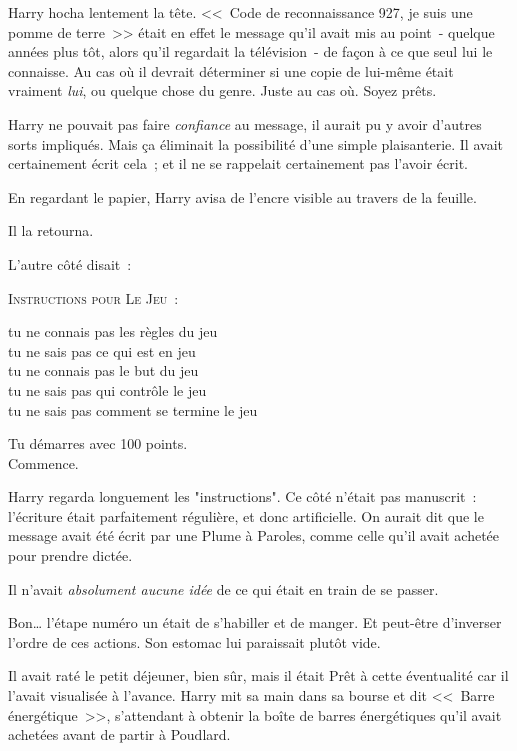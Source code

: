 Harry hocha lentement la tête. <<~Code de reconnaissance 927, je suis une pomme de terre~>> était en effet le message qu'il avait mis au point~- quelque années plus tôt, alors qu'il regardait la télévision~- de façon à ce que seul lui le connaisse. Au cas où il devrait déterminer si une copie de lui-même était vraiment \emph{lui}, ou quelque chose du genre. Juste au cas où. Soyez prêts.

Harry ne pouvait pas faire \emph{confiance} au message, il aurait pu y avoir d'autres sorts impliqués. Mais ça éliminait la possibilité d'une simple plaisanterie. Il avait certainement écrit cela~; et il ne se rappelait certainement pas l'avoir écrit.

En regardant le papier, Harry avisa de l'encre visible au travers de la feuille.

Il la retourna.

L'autre côté disait~:

\begin{writtenNote}\centering
\textsc{Instructions pour Le Jeu~:}

tu ne connais pas les règles du jeu\\
tu ne sais pas ce qui est en jeu\\
tu ne connais pas le but du jeu\\
tu ne sais pas qui contrôle le jeu\\
tu ne sais pas comment se termine le jeu


Tu démarres avec 100 points.\\
Commence.
\end{writtenNote}

Harry regarda longuement les "instructions". Ce côté n'était pas manuscrit~: l'écriture était parfaitement régulière, et donc artificielle. On aurait dit que le message avait été écrit par une Plume à Paroles, comme celle qu'il avait achetée pour prendre dictée.

Il n'avait \emph{absolument aucune idée} de ce qui était en train de se passer.

Bon… l'étape numéro un était de s'habiller et de manger. Et peut-être d'inverser l'ordre de ces actions. Son estomac lui paraissait plutôt vide.

Il avait raté le petit déjeuner, bien sûr, mais il était Prêt à cette éventualité car il l'avait visualisée à l'avance. Harry mit sa main dans sa bourse et dit <<~Barre énergétique~>>, s'attendant à obtenir la boîte de barres énergétiques qu'il avait achetées avant de partir à Poudlard.

